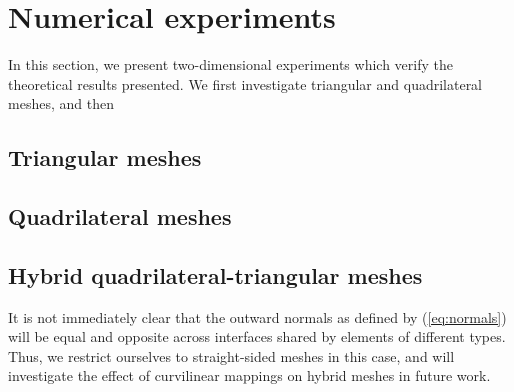 \documentclass{svjour3}                     %
\renewcommand{\note}[1]{{\color{blue}{#1}}}
\begin{document}
%
%
%

\section{Numerical experiments}
\label{sec:num}

In this section, we present two-dimensional experiments which verify the theoretical results presented.  We first investigate triangular and quadrilateral meshes, and then   

\subsection{Triangular meshes}

\note{Affine and curved triangles with GLL surface quadrature (under-integrated).}

\subsection{Quadrilateral meshes}

\note{ GLL quadrilaterals with Gauss surface quadrature.  Explain that for GLL quadratures, the decoupled SBP property doesn't hold when Gauss points are used.  }

\subsection{Hybrid quadrilateral-triangular meshes}

It is not immediately clear that the outward normals as defined by (\ref{eq:normals}) will be equal and opposite across interfaces shared by elements of different types.  Thus, we restrict ourselves to straight-sided meshes in this case, and will investigate the effect of curvilinear mappings on hybrid meshes in future work.  
\end{document}

